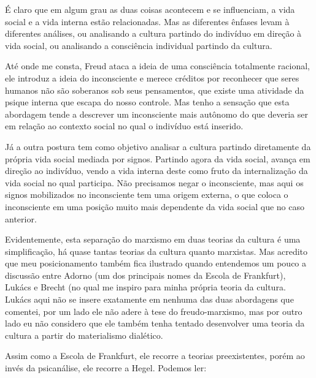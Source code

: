 É claro que em algum grau as duas coisas acontecem e se influenciam, a vida social e a vida interna estão relacionadas. Mas as diferentes ênfases levam à diferentes análises, ou analisando a cultura partindo do indivíduo em direção à vida social, ou analisando a consciência individual partindo da cultura. 

Até onde me consta, Freud ataca a ideia de uma consciência totalmente racional, ele introduz a ideia do inconsciente e merece créditos por reconhecer que seres humanos não são soberanos sob seus pensamentos, que existe uma atividade da psique interna que escapa do nosso controle. Mas tenho a sensação que esta abordagem tende a descrever um inconsciente mais autônomo do que deveria ser em relação ao contexto social no qual o indivíduo está inserido.

Já a outra postura tem como objetivo analisar a cultura partindo diretamente da própria vida social mediada por signos. Partindo agora da vida social, avança em direção ao indivíduo, vendo a vida interna deste como fruto da internalização da vida social no qual participa. Não precisamos negar o inconsciente, mas aqui os signos mobilizados no inconsciente tem uma origem externa, o que coloca o inconsciente em uma posição muito mais dependente da vida social que no caso anterior.

Evidentemente, esta separação do marxismo em duas teorias da cultura é uma simplificação, há quase tantas teorias da cultura quanto marxistas. Mas acredito que meu posicionamento também fica ilustrado quando entendemos um pouco a discussão entre Adorno (um dos principais nomes da Escola de Frankfurt), Lukács e Brecht (no qual me inspiro para minha própria teoria da cultura. Lukács aqui não se insere exatamente em nenhuma das duas abordagens que comentei, por um lado ele não adere à tese do freudo-marxismo, mas por outro lado eu não considero que ele também tenha tentado desenvolver uma teoria da cultura a partir do materialismo dialético.

Assim como a Escola de Frankfurt, ele recorre a teorias preexistentes, porém ao invés da psicanálise, ele recorre a Hegel. Podemos ler:

